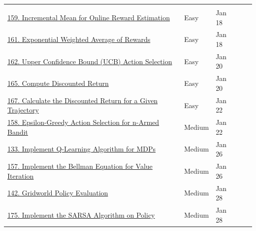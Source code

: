 \documentclass{article}
\begin{document}
\begin{longtable}{p{7.5cm} l l c c}
\rowcolor{gray!20} \multicolumn{5}{l}{\textbf{6. Reinforcement Learning}} \\
\href{https://www.deep-ml.com/problems/159}{159. Incremental Mean for Online Reward Estimation} & Easy & Jan 18 & & \\
\href{https://www.deep-ml.com/problems/161}{161. Exponential Weighted Average of Rewards} & Easy & Jan 18 & & \\
\href{https://www.deep-ml.com/problems/162}{162. Upper Confidence Bound (UCB) Action Selection} & Easy & Jan 20 & & \\
\href{https://www.deep-ml.com/problems/165}{165. Compute Discounted Return} & Easy & Jan 20 & & \\
\href{https://www.deep-ml.com/problems/167}{167. Calculate the Discounted Return for a Given Trajectory} & Easy & Jan 22 & & \\
\href{https://www.deep-ml.com/problems/158}{158. Epsilon-Greedy Action Selection for n-Armed Bandit} & Medium & Jan 22 & & \\
\href{https://www.deep-ml.com/problems/133}{133. Implement Q-Learning Algorithm for MDPs} & Medium & Jan 26 & & \\
\href{https://www.deep-ml.com/problems/157}{157. Implement the Bellman Equation for Value Iteration} & Medium & Jan 26 & & \\
\href{https://www.deep-ml.com/problems/142}{142. Gridworld Policy Evaluation} & Medium & Jan 28 & & \\
\href{https://www.deep-ml.com/problems/175}{175. Implement the SARSA Algorithm on Policy} & Medium & Jan 28 & & \\

\end{longtable}
\end{document}
